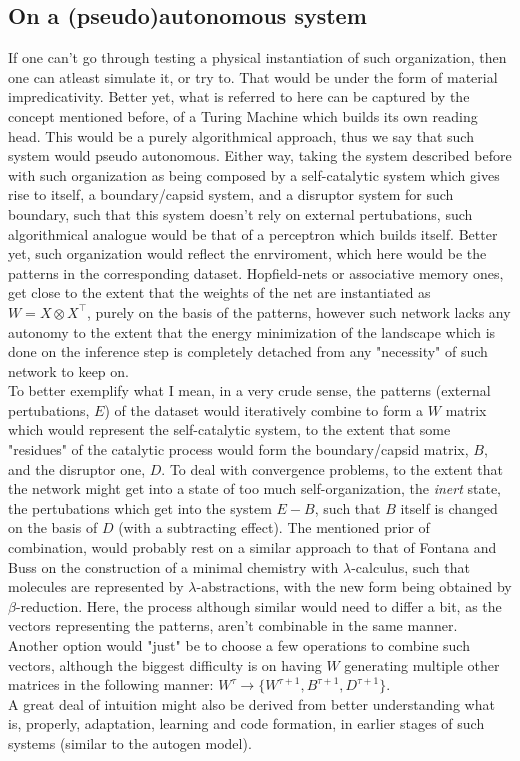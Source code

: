 \documentclass[a4paper,12pt,twoside,leqno]{article}
\begin{document}
\subsection*{On a (pseudo)autonomous system}
If one can't go through testing a physical instantiation of such organization, then one can atleast simulate it, or try to. That would be under the form of material impredicativity. Better yet, what is referred to here can be captured by the concept mentioned before, of a Turing Machine which builds its own reading head. This would be a purely algorithmical approach, thus we say that such system would pseudo autonomous. Either way, taking the system described before with such organization as being composed by a self-catalytic system which gives rise to itself, a boundary/capsid system, and a disruptor system for such boundary, such that this system doesn't rely on external pertubations, such algorithmical analogue would be that of a perceptron which builds itself. Better yet, such organization would reflect the enrviroment, which here would be the patterns in the corresponding dataset. Hopfield-nets or associative memory ones, get close to the extent that the weights of the net are instantiated as $W = X \otimes X^{\intercal}$, purely on the basis of the patterns, however such network lacks any autonomy to the extent that the energy minimization of the landscape which is done on the inference step is completely detached from any "necessity" of such network to keep on.\\
To better exemplify what I mean, in a very crude sense, the patterns (external pertubations, $E$) of the dataset would iteratively combine to form a $W$ matrix which would represent the self-catalytic system, to the extent that some "residues" of the catalytic process would form the boundary/capsid matrix, $B$, and the disruptor one, $D$. To deal with convergence problems, to the extent that the network might get into a state of too much self-organization, the \textit{inert} state, the pertubations which get into the system $E - B$, such that $B$ itself is changed on the basis of $D$ (with a subtracting effect). The mentioned prior of combination, would probably rest on a similar approach to that of Fontana and Buss on the construction of a minimal chemistry with $\lambda$-calculus, such that molecules are represented by $\lambda$-abstractions, with the new form being obtained by $\beta$-reduction. Here, the process although similar would need to differ a bit, as the vectors representing the patterns, aren't combinable in the same manner.\\
Another option would "just" be to choose a few operations to combine such vectors, although the biggest difficulty is on having $W$ generating multiple other matrices in the following manner: $W^{\tau} \rightarrow \{W^{\tau + 1}, B^{\tau + 1}, D^{\tau + 1}\}$.\\
A great deal of intuition might also be derived from better understanding what is, properly, adaptation, learning and code formation, in earlier stages of such systems (similar to the autogen model).
\end{document}

